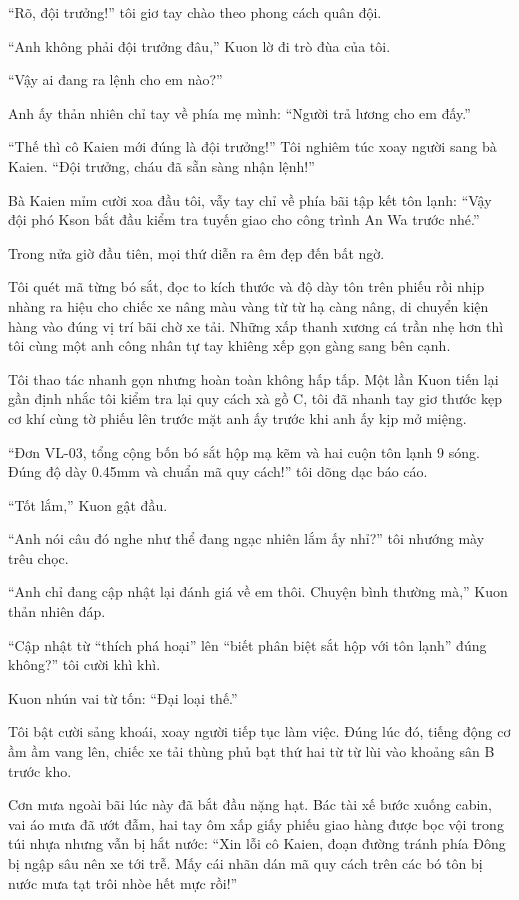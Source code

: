 ﻿\documentclass[../main.tex]{subfiles}
\begin{document}
``Rõ, đội trưởng!'' tôi giơ tay chào theo phong cách quân đội.

``Anh không phải đội trưởng đâu,'' Kuon lờ đi trò đùa của tôi.

``Vậy ai đang ra lệnh cho em nào?''

Anh ấy thản nhiên chỉ tay về phía mẹ mình: ``Người trả lương cho em đấy.''

``Thế thì cô Kaien mới đúng là đội trưởng!'' Tôi nghiêm túc xoay người sang bà Kaien. ``Đội trưởng, cháu đã sẵn sàng nhận lệnh!''

Bà Kaien mỉm cười xoa đầu tôi, vẫy tay chỉ về phía bãi tập kết tôn lạnh: ``Vậy đội phó Kson bắt đầu kiểm tra tuyến giao cho công trình An Wa trước nhé.''

\ct

Trong nửa giờ đầu tiên, mọi thứ diễn ra êm đẹp đến bất ngờ.

Tôi quét mã từng bó sắt, đọc to kích thước và độ dày tôn trên phiếu rồi nhịp nhàng ra hiệu cho chiếc xe nâng màu vàng từ từ hạ càng nâng, di chuyển kiện hàng vào đúng vị trí bãi chờ xe tải. Những xấp thanh xương cá trần nhẹ hơn thì tôi cùng một anh công nhân tự tay khiêng xếp gọn gàng sang bên cạnh.

Tôi thao tác nhanh gọn nhưng hoàn toàn không hấp tấp. Một lần Kuon tiến lại gần định nhắc tôi kiểm tra lại quy cách xà gồ C, tôi đã nhanh tay giơ thước kẹp cơ khí cùng tờ phiếu lên trước mặt anh ấy trước khi anh ấy kịp mở miệng.

``Đơn VL-03, tổng cộng bốn bó sắt hộp mạ kẽm và hai cuộn tôn lạnh 9 sóng. Đúng độ dày 0.45mm và chuẩn mã quy cách!'' tôi dõng dạc báo cáo.

``Tốt lắm,'' Kuon gật đầu.

``Anh nói câu đó nghe như thể đang ngạc nhiên lắm ấy nhỉ?'' tôi nhướng mày trêu chọc.

``Anh chỉ đang cập nhật lại đánh giá về em thôi. Chuyện bình thường mà,'' Kuon thản nhiên đáp.

``Cập nhật từ ``thích phá hoại'' lên ``biết phân biệt sắt hộp với tôn lạnh'' đúng không?'' tôi cười khì khì.

Kuon nhún vai từ tốn: ``Đại loại thế.''

Tôi bật cười sảng khoái, xoay người tiếp tục làm việc. Đúng lúc đó, tiếng động cơ ầm ầm vang lên, chiếc xe tải thùng phủ bạt thứ hai từ từ lùi vào khoảng sân B trước kho.

Cơn mưa ngoài bãi lúc này đã bắt đầu nặng hạt. Bác tài xế bước xuống cabin, vai áo mưa đã ướt đẫm, hai tay ôm xấp giấy phiếu giao hàng được bọc vội trong túi nhựa nhưng vẫn bị hắt nước: ``Xin lỗi cô Kaien, đoạn đường tránh phía Đông bị ngập sâu nên xe tới trễ. Mấy cái nhãn dán mã quy cách trên các bó tôn bị nước mưa tạt trôi nhòe hết mực rồi!''
\end{document}
